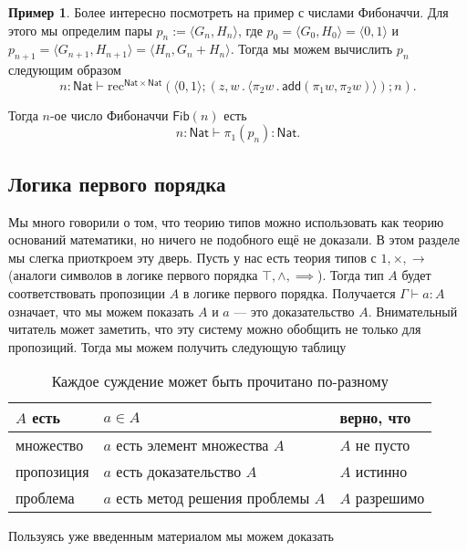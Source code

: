 \documentclass[openany]{book}
\theoremstyle{plain}
\theoremstyle{definition}
\newtheorem{eg}{Пример}[]
\newcommand{\rec}{\mathrm{rec}}
\newcommand{\nat}{\mathsf{Nat}}
\begin{document}
\begin{eg}
    Более интересно посмотреть на пример с числами Фибоначчи. Для этого мы определим пары \(p_n := \langle G_n, H_n \rangle\), где \(p_0 = \langle G_0, H_0 \rangle = \langle 0, 1 \rangle\) и \(p_{n+1} = \langle G_{n+1}, H_{n+1} \rangle = \langle H_n, G_n + H_n \rangle\). Тогда мы можем вычислить \(p_n\) следующим образом \[n : \nat \vdash \rec^{\nat \times \nat} (\langle 0, 1 \rangle; (z, w\,.\, \langle \pi_2 w\,.\, \mathsf{add}(\pi_1 w, \pi_2 w)\rangle); n).\]

    Тогда \(n\)-ое число Фибоначчи \(\mathsf{Fib}(n)\) есть \[n : \nat \vdash \pi_1(p_n) : \nat.\]
\end{eg}

\subsection{Логика первого порядка}

Мы много говорили о том, что теорию типов можно использовать как теорию оснований математики, но ничего не подобного ещё не доказали. В этом разделе мы слегка приоткроем эту дверь. Пусть у нас есть теория типов с \(1,  \times, \to\) (аналоги символов в логике первого порядка \(\top, \land, \implies\)). Тогда тип \(A\) будет соответствовать пропозиции \(A\) в логике первого порядка. Получается \(\Gamma \vdash a : A\) означает, что мы можем показать \(A\) и \(a\) --- это доказательство \(A\). Внимательный читатель может заметить, что эту систему можно обобщить не только для пропозиций. Тогда мы можем получить следующую таблицу
\begin{table}[H]
    \begin{tabular}{|l|l|l|}
        \hline
        \(A\) есть & \(a \in A\)                             & верно, что      \\ \hline
        множество  & \(a\) есть элемент множества \(A\)      & \(A\) не пусто  \\ \hline
        пропозиция & \(a\) есть доказательство \(A\)         & \(A\) истинно   \\ \hline
        проблема   & \(a\) есть метод решения проблемы \(A\) & \(A\) разрешимо \\ \hline
    \end{tabular}
    \centering
    \caption{Каждое суждение может быть прочитано по-разному}
\end{table}

Пользуясь уже введенным материалом мы можем доказать

\begin{prooftree}
\end{prooftree}
\end{document}

